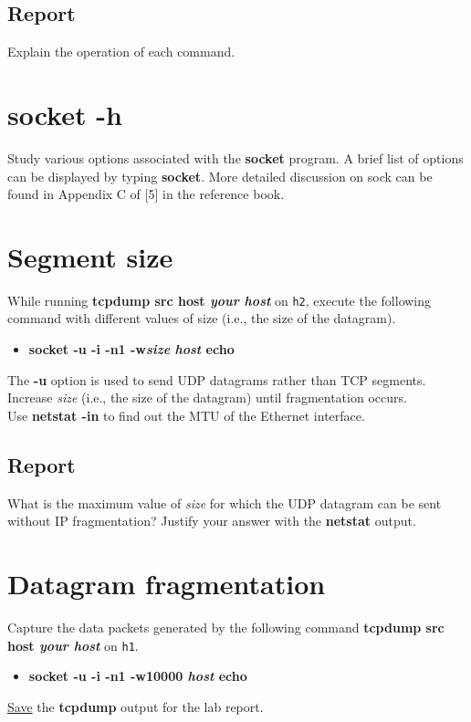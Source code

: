 \documentclass[10pt,a4paper]{article}
\numberwithin{equation}{section}
\numberwithin{figure}{section}
\numberwithin{table}{section}
\begin{document}
	\subsection*{Report}
	Explain the operation of each command.

\section{socket -h}
	Study various options associated with the \textbf{socket} program.
	A brief list of options can be displayed by typing \textbf{socket}. More detailed discussion on sock can be found in
	Appendix C of [5] in the reference book.

\section{Segment size}
	While running \textbf{tcpdump src host \textit{your host}} on \texttt{h2}, execute the following command with different values of size (i.e., the size of the datagram). \\
	\begin{itemize}
		\item \textbf{socket -u -i -n1 -w\textit{size} \textit{host} echo}
	\end{itemize}
	The \textbf{-u} option is used to send UDP datagrams rather than TCP segments. \\
	Increase \textit{size} (i.e., the size of the datagram) until fragmentation occurs. \\
	Use \textbf{netstat -in} to find out the MTU of the Ethernet interface.

	\subsection*{Report}
	What is the maximum value of \textit{size} for which the UDP datagram can be sent without IP fragmentation?
	Justify your answer with the \textbf{netstat} output.

\section{Datagram fragmentation}
	Capture the data packets generated by the following command \textbf{tcpdump src host \textit{your host}} on \texttt{h1}. \\
	\begin{itemize}
		\item \textbf{socket -u -i -n1 -w10000 \textit{host} echo}
	\end{itemize}
	\underline{Save} the \textbf{tcpdump} output for the lab report.
\end{document}
